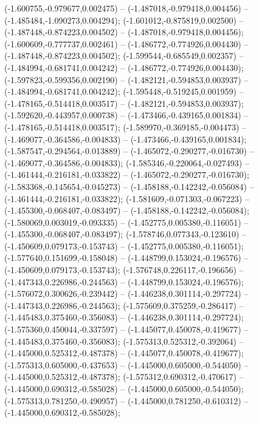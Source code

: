  (-1.600755,-0.979677,0.002475) -- (-1.487018,-0.979418,0.004456) -- (-1.485484,-1.090273,0.004294);
 (-1.601012,-0.875819,0.002500) -- (-1.487448,-0.874223,0.004502) -- (-1.487018,-0.979418,0.004456);
 (-1.600609,-0.777737,0.002461) -- (-1.486772,-0.774926,0.004430) -- (-1.487448,-0.874223,0.004502);
 (-1.599544,-0.685549,0.002357) -- (-1.484994,-0.681741,0.004242) -- (-1.486772,-0.774926,0.004430);
 (-1.597823,-0.599356,0.002190) -- (-1.482121,-0.594853,0.003937) -- (-1.484994,-0.681741,0.004242);
 (-1.595448,-0.519245,0.001959) -- (-1.478165,-0.514418,0.003517) -- (-1.482121,-0.594853,0.003937);
 (-1.592620,-0.443957,0.000738) -- (-1.473466,-0.439165,0.001834) -- (-1.478165,-0.514418,0.003517);
 (-1.589970,-0.369185,-0.004473) -- (-1.469077,-0.364586,-0.004833) -- (-1.473466,-0.439165,0.001834);
 (-1.587547,-0.294564,-0.013889) -- (-1.465072,-0.290277,-0.016730) -- (-1.469077,-0.364586,-0.004833);
 (-1.585346,-0.220064,-0.027493) -- (-1.461444,-0.216181,-0.033822) -- (-1.465072,-0.290277,-0.016730);
 (-1.583368,-0.145654,-0.045273) -- (-1.458188,-0.142242,-0.056084) -- (-1.461444,-0.216181,-0.033822);
 (-1.581609,-0.071303,-0.067223) -- (-1.455300,-0.068407,-0.083497) -- (-1.458188,-0.142242,-0.056084);
 (-1.580069,0.003019,-0.093335) -- (-1.452775,0.005380,-0.116051) -- (-1.455300,-0.068407,-0.083497);
 (-1.578746,0.077343,-0.123610) -- (-1.450609,0.079173,-0.153743) -- (-1.452775,0.005380,-0.116051);
 (-1.577640,0.151699,-0.158048) -- (-1.448799,0.153024,-0.196576) -- (-1.450609,0.079173,-0.153743);
 (-1.576748,0.226117,-0.196656) -- (-1.447343,0.226986,-0.244563) -- (-1.448799,0.153024,-0.196576);
 (-1.576072,0.300626,-0.239442) -- (-1.446238,0.301114,-0.297724) -- (-1.447343,0.226986,-0.244563);
 (-1.575609,0.375259,-0.286417) -- (-1.445483,0.375460,-0.356083) -- (-1.446238,0.301114,-0.297724);
 (-1.575360,0.450044,-0.337597) -- (-1.445077,0.450078,-0.419677) -- (-1.445483,0.375460,-0.356083);
 (-1.575313,0.525312,-0.392064) -- (-1.445000,0.525312,-0.487378) -- (-1.445077,0.450078,-0.419677);
 (-1.575313,0.605000,-0.437653) -- (-1.445000,0.605000,-0.544050) -- (-1.445000,0.525312,-0.487378);
 (-1.575312,0.690312,-0.470617) -- (-1.445000,0.690312,-0.585028) -- (-1.445000,0.605000,-0.544050);
 (-1.575313,0.781250,-0.490957) -- (-1.445000,0.781250,-0.610312) -- (-1.445000,0.690312,-0.585028);
